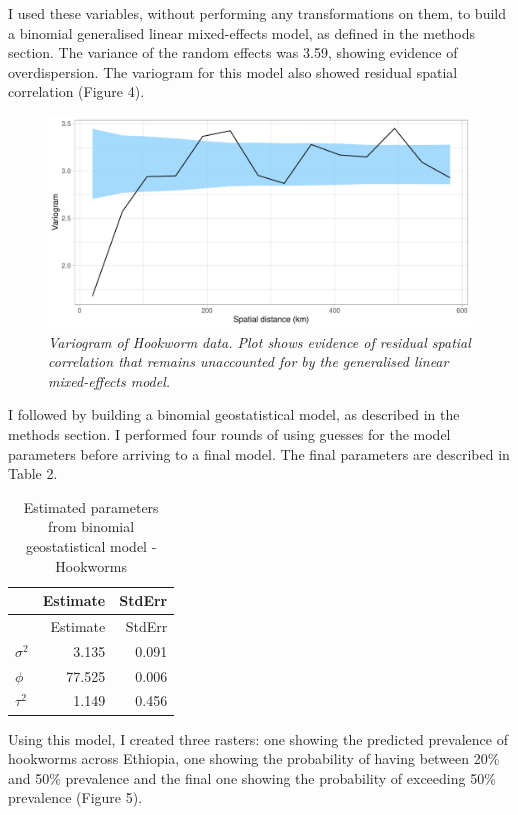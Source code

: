 \documentclass[
]{article}
\begin{document}
I used these variables, without performing any transformations on them,
to build a binomial generalised linear mixed-effects model, as defined
in the methods section. The variance of the random effects was 3.59,
showing evidence of overdispersion. The variogram for this model also
showed residual spatial correlation (Figure 4).

\begin{figure}
\centering
\includegraphics{write_up_files/figure-latex/HK.variogram_2-1.pdf}
\caption{\textit{Variogram of Hookworm data. Plot shows evidence of residual spatial correlation that remains unaccounted for by the generalised linear mixed-effects model.}}
\end{figure}

I followed by building a binomial geostatistical model, as described in
the methods section. I performed four rounds of using guesses for the
model parameters before arriving to a final model. The final parameters
are described in Table 2.

\begin{longtable}[]{@{}lrr@{}}
\caption{Estimated parameters from binomial geostatistical model -
Hookworms}\tabularnewline
\toprule
& Estimate & StdErr \\
\midrule
\endfirsthead
\toprule
& Estimate & StdErr \\
\midrule
\endhead
\(\sigma^2\) & 3.135 & 0.091 \\
\(\phi\) & 77.525 & 0.006 \\
\(\tau^2\) & 1.149 & 0.456 \\
\bottomrule
\end{longtable}

Using this model, I created three rasters: one showing the predicted
prevalence of hookworms across Ethiopia, one showing the probability of
having between 20\% and 50\% prevalence and the final one showing the
probability of exceeding 50\% prevalence (Figure 5).
\end{document}
